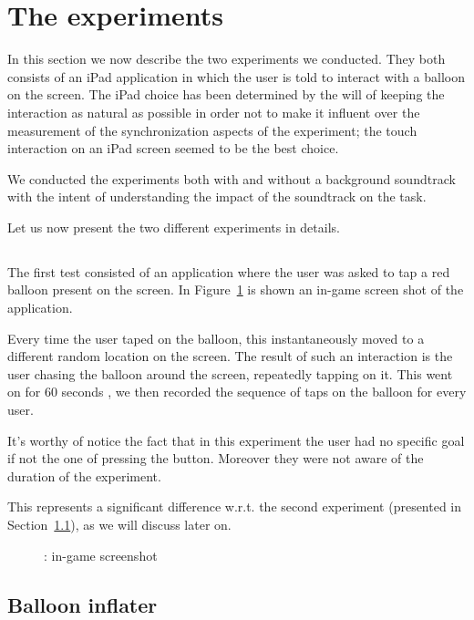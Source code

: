 \section{The experiments}
In this section we now describe the two experiments we conducted. They both consists of an iPad application in which the user is told to interact with a balloon on the screen. The iPad choice has been determined by the will of keeping the interaction as natural as possible in order not to make it influent over the measurement of the synchronization aspects of the experiment; the touch interaction on an iPad screen seemed to be the best choice.

We conducted the experiments both with and without a background soundtrack with the intent of understanding the impact of the soundtrack on the task.

Let us now present the two different experiments in details.

\subsection{\testfirst}
\label{sec:test1}
The first test consisted of an application where the user was asked to tap a red balloon present on the screen. In Figure~\ref{fig:test1} is shown an in-game screen shot of the application.

Every time the user taped on the balloon, this instantaneously moved to a different random location on the screen. The result of such an interaction is the user chasing the balloon around the screen, repeatedly tapping on it. This went on for 60 seconds , we then recorded the sequence of taps on the balloon for every user.

It's worthy of notice the fact that in this experiment the user had no specific goal if not the one of pressing the button. Moreover they were not aware of the duration of the experiment.

This represents a significant difference w.r.t. the second experiment (presented in Section~\ref{sec:test1}), as we will discuss later on.

\begin{figure}[h!t]
\label{fig:test1}
\centering
	{\setlength{\fboxsep}{0pt}
	 }
\caption{\testfirst: in-game screenshot}
\end{figure}

\subsection{Balloon inflater}
\label{sec:test2}
{\color{Gray}{\lipsum[7-15]}}